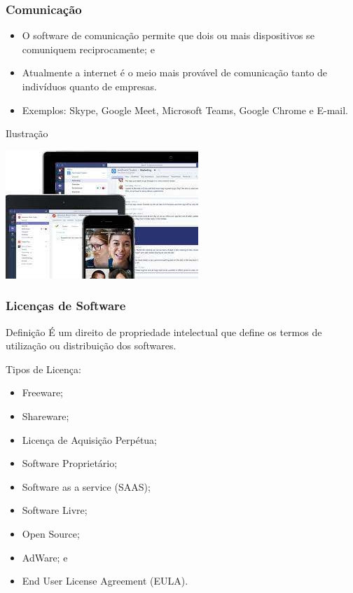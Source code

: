 \documentclass[aspectratio=169]{beamer} %
\begin{document}
\begin{frame}
	\frametitle{Comunica\c cão}
		
	\begin{itemize}
		\item O software de comunicação permite que dois ou mais dispositivos se comuniquem reciprocamente; e
		\item Atualmente a internet é o meio mais provável de comunicação tanto de indivíduos quanto de empresas.
		\item Exemplos: Skype, Google Meet, Microsoft Teams, Google Chrome e E-mail.
	\end{itemize}\vfill
	
	\begin{exampleblock}{Ilustra\c cão}
		\begin{center}
			\includegraphics[scale=0.4]{img/teams}
		\end{center}
	\end{exampleblock}
\end{frame}

\begin{frame}
	\frametitle{Licen\c cas de Software}

	\begin{block}{Defini\c cão}
		É um direito de propriedade intelectual que define os termos de utiliza\c cão ou distribui\c cão dos softwares.
	\end{block}\vfill
		
	Tipos de Licen\c ca:
	\begin{itemize}
		\item Freeware;
		\item Shareware;
		\item Licen\c ca de Aquisi\c cão Perpétua;
		\item Software Proprietário;
		\item Software as a service (SAAS);
		\item Software Livre;
		\item Open Source;
		\item AdWare; e
		\item End User License Agreement (EULA).
	\end{itemize}
\end{frame}
\end{document}
